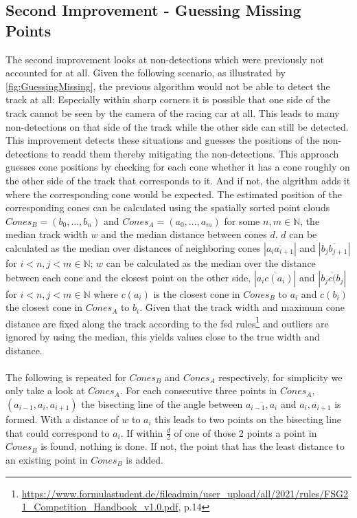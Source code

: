 \subsection{Second Improvement - Guessing Missing Points}
The second improvement looks at non-detections which were previously not accounted for at all. Given the following scenario, as illustrated by \ref{fig:GuessingMissing}, the previous algorithm would not be able to detect the track at all: Especially within sharp corners it is possible that one side of the track cannot be seen by the camera of the racing car at all. This leads to many non-detections on that side of the track while the other side can still be detected. This improvement detects these situations and guesses the positions of the non-detections to readd them thereby mitigating the non-detections. This approach guesses cone positions by checking for each cone whether it has a cone roughly on the other side of the track that corresponds to it. And if not, the algrithm adds it where the corresponding cone would be expected. The estimated position of the corresponding cones can be calculated using the spatially sorted point clouds $Cones_B = (b_0,...,b_n)$ and $Cones_A = (a_0,...,a_m)$ for some $n,m \in \mathbb{N}$, the median track width $w$ and the median distance between cones $d$. $d$ can be calculated as the median over distances of neighboring cones $|\overline{a_i a_{i+1}}|$ and $|\overline{b_j b_{j+1}}|$ for $i<n,j<m \in \mathbb{N}$; $w$ can be calculated as the median over the distance between each cone and the closest point on the other side, $|\overline{a_i c(a_{i})}|$ and $|\overline{b_j c(b_{j}}|$ for $i<n,j<m \in \mathbb{N}$ where $c(a_i)$ is the closest cone in $Cones_B$ to $a_i$ and $c(b_i)$ the closest cone in $Cones_A$ to $b_i$. Given that the track width and maximum cone distance are fixed along the track according to the \ac{fsd} rules\footnote{\url{https://www.formulastudent.de/fileadmin/user_upload/all/2021/rules/FSG21_Competition_Handbook_v1.0.pdf}, p.14} and outliers are ignored by using the median, this yields values close to the true width and distance.\\
\\The following is repeated for $Cones_B$ and $Cones_A$ respectively, for simplicity we only take a look at $Cones_A$. For each consecutive three points in $Cones_A$, $(a_{i-1},a_{i},a_{i+1})$ the bisecting line of the angle between $\overline{a_{i-1},a_{i}}$ and $\overline{a_{i},a_{i+1}}$ is formed. With a distance of $w$ to $a_{i}$ this leads to two points on the bisecting line that could correspond to  $a_{i}$. If within $\frac{d}{2}$ of one of those 2 points a point in $Cones_B$ is found, nothing is done. If not,  the point that has the least distance to an existing point in $Cones_B$ is added. \\
